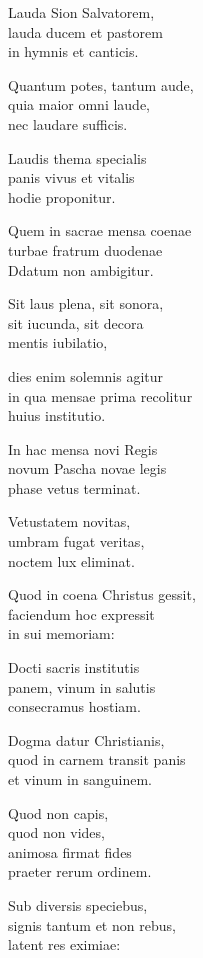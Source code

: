 \documentclass[parskip=full]{scrreprt}
\DeclareRobustCommand{\ltseries}{\fontseries{lt}\selectfont}
\begin{document}
\bigskip
\begin{multicols}{3}[\ltseries]
Lauda Sion Salvatorem,\\
lauda ducem et pastorem\\
in hymnis et canticis.

Quantum potes, tantum aude,\\
quia maior omni laude,\\
nec laudare sufficis.

Laudis thema specialis\\
panis vivus et vitalis\\
hodie proponitur.

Quem in sacrae mensa coenae\\
turbae fratrum duodenae\\
Ddatum non ambigitur.

Sit laus plena, sit sonora,\\
sit iucunda, sit decora\\
mentis iubilatio,

dies enim solemnis agitur\\
in qua mensae prima recolitur\\
huius institutio.

In hac mensa novi Regis\\
novum Pascha novae legis\\
phase vetus terminat.

Vetustatem novitas,\\
umbram fugat veritas,\\
noctem lux eliminat.

Quod in coena Christus gessit,\\
faciendum hoc expressit\\
in sui memoriam:

Docti sacris institutis\\
panem, vinum in salutis\\
consecramus hostiam.

Dogma datur Christianis,\\
quod in carnem transit panis\\
et vinum in sanguinem.

Quod non capis,\\
\hspace*{1em}quod non vides,\\
animosa firmat fides\\
praeter rerum ordinem.

Sub diversis speciebus,\\
signis tantum et non rebus,\\
latent res eximiae:


\end{multicols}
\end{document}
